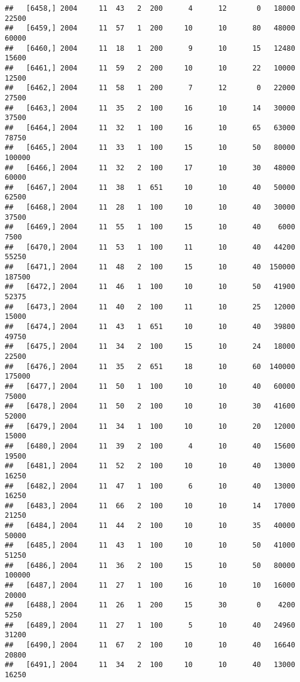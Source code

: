 \documentclass{article}\usepackage[]{graphicx}\usepackage[]{color}
\makeatletter
\newenvironment{kframe}{%
 \def\at@end@of@kframe{}%
 \ifinner\ifhmode%
  \def\at@end@of@kframe{\end{minipage}}%
  \begin{minipage}{\columnwidth}%
 \fi\fi%
 \def\FrameCommand##1{\hskip\@totalleftmargin \hskip-\fboxsep
 \colorbox{shadecolor}{##1}\hskip-\fboxsep
     \hskip-\linewidth \hskip-\@totalleftmargin \hskip\columnwidth}%
 \MakeFramed {\advance\hsize-\width
   \@totalleftmargin\z@ \linewidth\hsize
   \@setminipage}}%
 {\par\unskip\endMakeFramed%
 \at@end@of@kframe}
\newenvironment{knitrout}{}{} %
\makeatother
\begin{document}
\begin{knitrout}
\begin{kframe}
\begin{verbatim}
##   [6458,] 2004     11  43   2  200      4      12       0   18000   22500
##   [6459,] 2004     11  57   1  200     10      10      80   48000   60000
##   [6460,] 2004     11  18   1  200      9      10      15   12480   15600
##   [6461,] 2004     11  59   2  200     10      10      22   10000   12500
##   [6462,] 2004     11  58   1  200      7      12       0   22000   27500
##   [6463,] 2004     11  35   2  100     16      10      14   30000   37500
##   [6464,] 2004     11  32   1  100     16      10      65   63000   78750
##   [6465,] 2004     11  33   1  100     15      10      50   80000  100000
##   [6466,] 2004     11  32   2  100     17      10      30   48000   60000
##   [6467,] 2004     11  38   1  651     10      10      40   50000   62500
##   [6468,] 2004     11  28   1  100     10      10      40   30000   37500
##   [6469,] 2004     11  55   1  100     15      10      40    6000    7500
##   [6470,] 2004     11  53   1  100     11      10      40   44200   55250
##   [6471,] 2004     11  48   2  100     15      10      40  150000  187500
##   [6472,] 2004     11  46   1  100     10      10      50   41900   52375
##   [6473,] 2004     11  40   2  100     11      10      25   12000   15000
##   [6474,] 2004     11  43   1  651     10      10      40   39800   49750
##   [6475,] 2004     11  34   2  100     15      10      24   18000   22500
##   [6476,] 2004     11  35   2  651     18      10      60  140000  175000
##   [6477,] 2004     11  50   1  100     10      10      40   60000   75000
##   [6478,] 2004     11  50   2  100     10      10      30   41600   52000
##   [6479,] 2004     11  34   1  100     10      10      20   12000   15000
##   [6480,] 2004     11  39   2  100      4      10      40   15600   19500
##   [6481,] 2004     11  52   2  100     10      10      40   13000   16250
##   [6482,] 2004     11  47   1  100      6      10      40   13000   16250
##   [6483,] 2004     11  66   2  100     10      10      14   17000   21250
##   [6484,] 2004     11  44   2  100     10      10      35   40000   50000
##   [6485,] 2004     11  43   1  100     10      10      50   41000   51250
##   [6486,] 2004     11  36   2  100     15      10      50   80000  100000
##   [6487,] 2004     11  27   1  100     16      10      10   16000   20000
##   [6488,] 2004     11  26   1  200     15      30       0    4200    5250
##   [6489,] 2004     11  27   1  100      5      10      40   24960   31200
##   [6490,] 2004     11  67   2  100     10      10      40   16640   20800
##   [6491,] 2004     11  34   2  100     10      10      40   13000   16250

\end{verbatim}
\end{kframe}
\end{knitrout}
\end{document}
